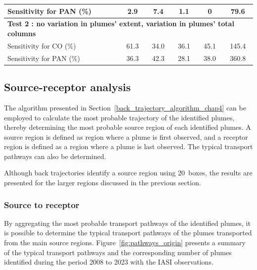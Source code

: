 \documentclass[acp, manuscript]{copernicus}
\begin{document}
\begin{table}
\begin{center}
\begin{tabular}{|l|c|c|c|c|c|}
        \hline
        Sensitivity for PAN (\%) & 2.9 & 7.4 & 1.1 & 0 & 79.6  \\    
        \hline
        \hline
        \multicolumn{6}{|l|}{\textbf{Test 2 : no variation in plumes' extent, variation in plumes' total columns}}	\\
        \hline
        Sensitivity for CO (\%) & 61.3 & 34.0  & 36.1  &  45.1  & 145.4    \\
        \hline
        Sensitivity for PAN (\%) & 36.3 & 42.3 & 28.1 & 38.0 & 360.8  \\    
        \hline
\end{tabular}
\end{center}
\end{table}








\subsection{Source-receptor analysis}{\label{origin_traj_chap4}}

The algorithm presented in Section~\ref{back_trajectory_algorithm_chap4} can be employed to calculate the most probable trajectory of the identified plumes, thereby determining the most probable source region of each identified plumes. A source region is defined as region where a plume is first observed, and a receptor region is defined as a region where a plume is last observed. The typical transport pathways can also be determined. 

Although back trajectories identify a source region using 20\textdegree {}\textdegree\ boxes, the results are presented for the larger regions discussed in the previous section.
 


\subsubsection{Source to receptor}

By aggregating the most probable transport pathways of the identified plumes, it is possible to determine the typical transport pathways of the plumes transported from the main source regions. Figure~\ref{fig:pathways_origin} presents a summary of the typical transport pathways and the corresponding number of plumes identified during the period 2008 to 2023 with the IASI observations. 
\end{document}
